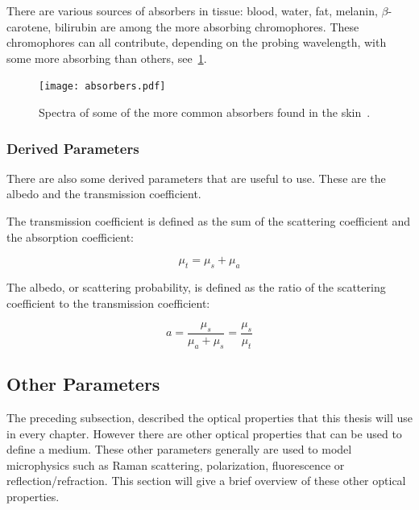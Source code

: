 There are various sources of absorbers in tissue: blood, water, fat, melanin, $\beta$-carotene, bilirubin are among the more absorbing chromophores. These chromophores can all contribute, depending on the probing wavelength, with some more absorbing than others, see~\cref{fig:absorb}. 

\begin{figure}
	\centering
	\texttt{[image: absorbers.pdf]}
	\caption{Spectra of some of the more common absorbers found in the skin~\cite{dixon2005photochemcad,photoprahl2017,segelstein1981complex,pope1997absorption,jacques2013optical,van2004determination,saidi1992transcutaneous,iglesias2015biophysically,bashkatov2011optical,sarna2006physical}.}
	\label{fig:absorb}
\end{figure}


\subsubsection{Derived Parameters}

There are also some derived parameters that are useful to use.
These are the albedo and the transmission coefficient.

The transmission coefficient is defined as the sum of the scattering coefficient and the absorption coefficient:

\begin{equation}
\mu_t=\mu_s+\mu_a
\end{equation}

The albedo, or scattering probability, is defined as the ratio of the scattering coefficient to the transmission coefficient:

\begin{equation}
a = \frac{\mu_s}{\mu_a+\mu_s}=\frac{\mu_s}{\mu_t}
\end{equation}


\subsection*{Other Parameters}\label{sec:other}
The preceding subsection, described the optical properties that this thesis will use in every chapter. However there are other optical properties that can be used to define a medium. These other parameters generally are used to model microphysics such as Raman scattering, polarization, fluorescence or reflection/refraction. This section will give a brief overview of these other optical properties.



